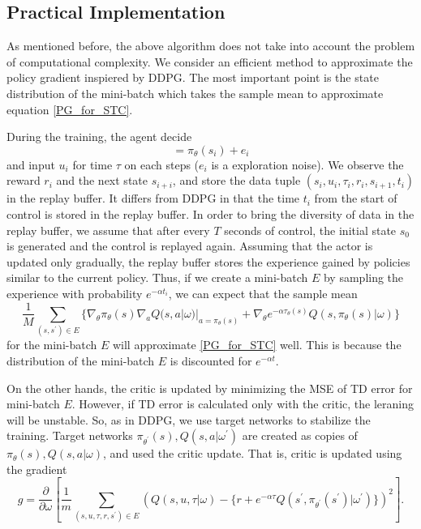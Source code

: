 \documentclass[english, dvipdfmx]{ampmt}             %
\newcommand{\pdif}[2]{\frac{\partial#1}{\partial#2}}
\begin{document}
\subsection{Practical Implementation}
As mentioned before, the above algorithm does not take into account the problem of computational complexity. We consider an efficient method to approximate the policy gradient inspiered by DDPG. The most important point is the state distribution of the mini-batch which takes the sample mean to approximate equation \eqref{PG_for_STC}. \par
During the training, the agent decide
\begin{equation}
	[u_i, \tau_i] = \pi_{\theta}(s_i) + e_i
\end{equation}
and input $u_i$ for time $\tau$ on each steps ($e_i$ is a exploration noise). We observe the reward $r_i$ and the next state $s_{i+i}$, and store the data tuple $(s_i, u_i, \tau_i, r_i, s_{i+1}, t_i)$ in the replay buffer. It differs from DDPG in that the time $t_i$ from the start of control is stored in the replay buffer. In order to bring the diversity of data in the replay buffer, we assume that after every $T$ seconds of control, the initial state $s_0$ is generated and the control is replayed again. Assuming that the actor is updated only gradually, the replay buffer stores the experience gained by policies similar to the current policy. Thus, if we create a mini-batch $E$ by sampling the experience with probability $e^{-\alpha t_i}$, we can expect that the sample mean
\begin{equation}
	\frac{1}{M}\sum_{(s, s^{\prime})\in E}\{\nabla_{\theta}\pi_{\theta}(s)\nabla_{a}Q(s,a|\omega)|_{a=\pi_{\theta}(s)}+\nabla_{\theta}e^{-\alpha\tau_{\theta}(s)}Q(s, \pi_{\theta}(s)|\omega)\} \label{app_pg_stc}
\end{equation}
for the mini-batch $E$ will approximate \eqref{PG_for_STC} well. This is because the distribution of the mini-batch $E$ is discounted for $e^{-\alpha t}$. \par
On the other hands, the critic is updated by minimizing the MSE of TD error for mini-batch $E$. However, if TD error is calculated only with the critic, the leraning will be unstable. So, as in DDPG, we use target networks to stabilize the training. Target networks $\pi_{\theta^{\prime}}(s), Q(s,a|\omega^{\prime})$ are created as copies of $\pi_{\theta}(s), Q(s,a|\omega)$, and used the critic update. That is, critic is updated using the gradient
\begin{equation}
	g = \pdif{}{\omega}\left[\frac{1}{m}\sum_{(s,u,\tau,r,s^{\prime})\in E}\left(Q(s,u,\tau|\omega) - \{r + e^{-\alpha\tau}Q(s^{\prime}, \pi_{\theta^{\prime}}(s^{\prime})|\omega^{\prime})\}\right)^2\right].
\end{equation}
\end{document}
